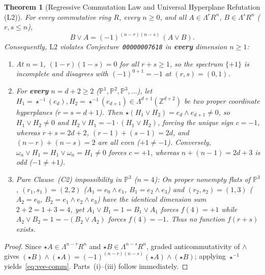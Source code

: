 \documentclass[11pt]{article}
\newtheorem{theorem}{Theorem}[section]
\theoremstyle{definition}
\newcommand{\Proj}{\mathbb{P}}
\newcommand{\Z}{\mathbb{Z}}
\begin{document}
\begin{theorem}[Regressive Commutation Law and Universal Hyperplane Refutation ($\mathrm{L2}$)]\label{thm:L2-refute}
For every commutative ring $R$, every $n \ge 0$, and all $A \in \Lambda^r R^n$, $B \in \Lambda^s R^n$ ($r, s \le n$),
\begin{equation}\label{eq:vee-comm}
B \vee A = (-1)^{(n-r)(n-s)}\,(A \vee B).
\end{equation}
Consequently, $\mathrm{L2}$ violates Conjecture~\texttt{00000007618} in \textbf{every} dimension $n \ge 1$:
\begin{enumerate}
\item At $n = 1$, $(1-r)(1-s) = 0$ for all $r + s \ge 1$, so the spectrum $\{+1\}$ is incomplete and disagrees with $(-1)^{0+1} = -1$ at $(r, s) = (0, 1)$.
\item For \textbf{every} $n = d + 2 \ge 2$ ($\Proj^1, \Proj^2, \Proj^3, \dots$), let $H_1 = \star^{-1}(e_d), H_2 = \star^{-1}(e_{d+1}) \in \Lambda^{d+1}(\Z^{d+2})$ be two proper coordinate hyperplanes ($r = s = d + 1$). Then $\star(H_1 \vee H_2) = e_d \wedge e_{d+1} \neq 0$, so $H_1 \vee H_2 \neq 0$ and $H_2 \vee H_1 = -1 \cdot (H_1 \vee H_2)$, forcing the unique sign $c = -1$, whereas $r + s = 2d + 2$, $(r-1)+(s-1) = 2d$, and $(n-r)+(n-s) = 2$ are all even ($+1 \neq -1$). Conversely, $\omega_n \vee H_1 = H_1 \vee \omega_n = H_1 \neq 0$ forces $c = +1$, whereas $n + (n - 1) = 2d + 3$ is odd ($-1 \neq +1$).
\item \emph{Pure Clause~(C2) impossibility in $\Proj^3$ ($n = 4$):} On proper nonempty flats of $\Proj^3$, $(r_1, s_1) = (2, 2)$ ($A_1 = e_0 \wedge e_1$, $B_1 = e_2 \wedge e_3$) and $(r_2, s_2) = (1, 3)$ ($A_2 = e_0$, $B_2 = e_1 \wedge e_2 \wedge e_3$) have the \emph{identical} dimension sum $2 + 2 = 1 + 3 = 4$, yet $A_1 \vee B_1 = 1 = B_1 \vee A_1$ forces $f(4) = +1$ while $A_2 \vee B_2 = 1 = -(B_2 \vee A_2)$ forces $f(4) = -1$. Thus no function $f(r + s)$ exists.
\end{enumerate}
\end{theorem}
\begin{proof}
Since $\star A \in \Lambda^{n-r} R^n$ and $\star B \in \Lambda^{n-s} R^n$, graded anticommutativity of $\wedge$ gives $(\star B) \wedge (\star A) = (-1)^{(n-r)(n-s)} (\star A) \wedge (\star B)$; applying $\star^{-1}$ yields~\eqref{eq:vee-comm}. Parts~(i)--(iii) follow immediately.
\end{proof}
\end{document}
